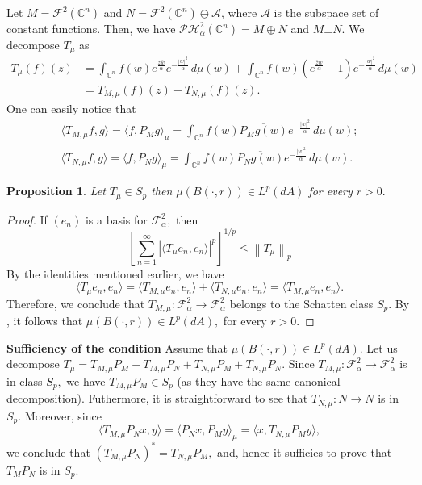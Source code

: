 \documentclass[10pt,leqno]{amsart}
\newtheorem{proposition}[theorem]{Proposition}
\theoremstyle{remark}
\numberwithin{equation}{section}
\newcommand{\hph}{\mathcal{PH}_\alpha^2(\mathbb{C}^n)}%
\begin{document}
Let $M=\mathcal{F}^2(\mathbb{C}^{n})$ and $N=\mathcal{F}^2 (\mathbb{C}^{n})\ominus \mathcal{A}$, where $\mathcal{A}$ is the subspace set of constant functions. Then, we have $\hph = M \oplus N$ and $M \bot N.$
We decompose $T_\mu$ as
\[
	\begin{split}
		T_\mu (f)(z) & =\int_{\mathbb{C}^{n}}^{}f(w)e^{\frac{z \bar{w}}{\alpha}}e^{-\frac{|w|^2}{\alpha}}\, d\mu(w) + \int_{\mathbb{C}^{n}}^{}f(w) \left( e^{\frac{\bar{z} w}{\alpha}} -1 \right) e^{-\frac{|w|^2}{\alpha}}\, d\mu(w) \\
		             & = T_{M,\mu}(f)(z)+T_{N,\mu}(f)(z).
	\end{split}
\]
One can easily notice that
\[
	\begin{split}
		\langle T_{M,\mu}f,g \rangle= \langle f,P_M g \rangle_{\mu}= \int_{\mathbb{C}^{n}}^{}f(w) \overline{P_M g(w)}e^{-\frac{|w|^2}{\alpha}}\, d\mu(w); \\
		\langle T_{N,\mu}f,g \rangle= \langle f,P_N g \rangle_\mu= \int_{\mathbb{C}^{n}}^{}f(w) \overline{P_N g(w)}e^{-\frac{|w|^2}{\alpha}}\, d\mu(w).
	\end{split}
\]
\begin{proposition}
	Let $T_\mu \in S_p$ then $\mu(B(\cdot,r)) \in L^p(dA)$ for every $r>0.$
\end{proposition}
\begin{proof}
	If $(e_n)$ is a basis for $\mathcal{F}_\alpha^{2},$ then
	\[
		\left[ \sum_{n=1}^{\infty} |\langle T_\mu e_n,e_n  \rangle|^p \right] ^{1/p} \leq \left\lVert T_\mu \right\rVert_p
	\]
	By the identities mentioned earlier, we have
	\[
		\langle T_\mu e_n,e_n \rangle= \langle T_{M,\mu}e_n,e_n \rangle + \langle T_{N,\mu}e_n,e_n \rangle = \langle T_{M,\mu}e_n,e_n \rangle.
	\]
	Therefore, we conclude that $T_{M,\mu} : \mathcal{F}_\alpha^2  \to \mathcal{F}_{\alpha}^2$ belongs to the Schatten class $S_p.$ By \cite[Thm 4.4]{isralowitzToeplitzOperatorsFock2010}, it follows that $\mu(B(\cdot,r)) \in L^p(dA),$ for every $r>0.$
\end{proof}
\textbf{Sufficiency of the condition} Assume that $\mu(B(\cdot,r)) \in L^p(dA).$
Let us decompose $T_\mu = T_{M,\mu}P_M+ T_{M,\mu}P_N + T_{N,\mu}P_M + T_{N,\mu}P_N.$ Since $T_{M,\mu}: \mathcal{F}_\alpha^{2}\to \mathcal{F}_{\alpha}^{2}$ is in class $S_p,$ we have $T_{M,\mu}P_M \in S_p$ (as they have the same canonical decomposition). Futhermore,  it is straightforward to see that $T_{N,\mu}:N \to N$ is in $S_p.$ Moreover, since
\[
	\langle T_{M,\mu} P_N x,y \rangle = \langle P_N x,P_M y \rangle_{\mu} = \langle x,T_{N,\mu} P_M y \rangle,
\]
we conclude that $(T_{M,\mu} P_N)^* = T_{N,\mu} P_M,  $ and, hence it sufficies to prove that $T_M P_N$ is in $S_p.$
\end{document}
